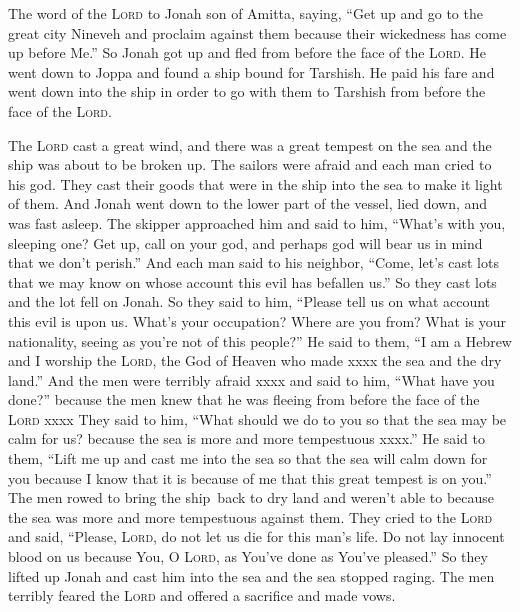 
\begin{inparaenum}
   The word of the \textsc{Lord} to Jonah son of Amitta, saying,%
   ``Get up and go to the great city Nineveh and proclaim against them because their wickedness has come up before Me.''%
   So Jonah got up  and fled from before the face of the \textsc{Lord}. He went down to Joppa and found a ship bound for Tarshish. He paid his fare and went down into the ship in order to go with them to Tarshish from before the face of the \textsc{Lord}.%
  
   The \textsc{Lord} cast a great wind, and there was a great tempest on the sea and the ship was about to be broken up.%
   The sailors were afraid and each man cried to his god. They cast their goods that were in the ship into the sea to make it light of them. And Jonah went down to the lower part of the vessel, lied down, and was fast asleep.%
   The skipper approached him and said to him, ``What's with you, sleeping one? Get up, call on your god, and perhaps god will bear us in mind that we don't perish.''%
   And each man said to his neighbor, ``Come, let's cast lots that we may know on whose account this evil has befallen us.'' So they cast lots and the lot fell on Jonah.%
   So they said to him, ``Please tell us on what account this evil is upon us. What's your occupation? Where are you from? What is your nationality, seeing as you're not of this people?''%
   He said to them, ``I am a Hebrew and I worship the \textsc{Lord}, the God of Heaven who made xxxx the sea and the dry land.''%
   And the men were terribly afraid xxxx and said to him, ``What have you done?'' because the men knew that he was fleeing from before the face of the \textsc{Lord} xxxx%
   They said to him, ``What should we do to you so that the sea may be calm for us? because the sea is more and more tempestuous xxxx.''%
   He said to them, ``Lift me up and cast me into the sea so that the sea will calm down for you because I know that it is because of me that this great tempest is on you.''%
   The men rowed to bring the ship\understood\ back to dry land and weren't able to because the sea was more and more tempestuous against them.%
   They cried to the \textsc{Lord} and said, ``Please, \textsc{Lord}, do not let us die for this man's life. Do not lay innocent blood on us because You, O \textsc{Lord}, as You've done as You've pleased.''%
   So they lifted up Jonah and cast him into the sea and the sea stopped raging.%
   The men terribly feared the \textsc{Lord} and offered a sacrifice and made vows.%
\end{inparaenum}
